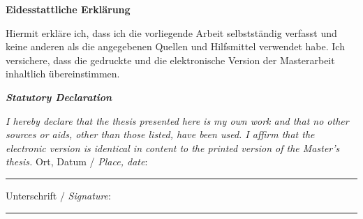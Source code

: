 \addchap*{}
\begin{center}
    \bfseries \Large
    Eidesstattliche Erklärung
\end{center}
    Hiermit erkläre ich,
    dass ich die vorliegende Arbeit selbstständig verfasst und keine anderen als die angegebenen Quellen und Hilfsmittel verwendet habe.
    Ich versichere,
    dass die gedruckte und die elektronische Version der Masterarbeit inhaltlich übereinstimmen.
\begin{center}
    \bfseries\itshape \Large
    Statutory Declaration
\end{center}
{
\itshape
I hereby declare that
the thesis presented here is my own work and that no other sources or aids, other than those listed, have been used.
I affirm that the electronic version is identical in content to the printed version of the Master's thesis.}
  \vfill
  \vfill
  Ort, Datum / \textit{Place, date}:\\
  \rule[1em]{25em}{0.5pt}  %

  Unterschrift / \textit{Signature}:\\
  \rule[1em]{25em}{0.5pt}  %
